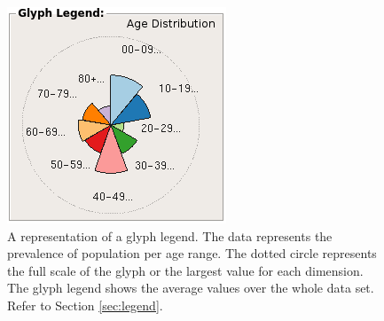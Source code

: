 \begin{figure}
\centering
\includegraphics[width=0.55\linewidth]{images/ch5/GlyphLegend2}
\caption{A representation of a glyph legend. The data represents the prevalence of population per age range. The dotted circle represents the full scale of the glyph or the largest value for each dimension. The glyph legend shows the average values over the whole data set. Refer to Section \ref{sec:legend}.} \label{fig:legend}
\end{figure}

